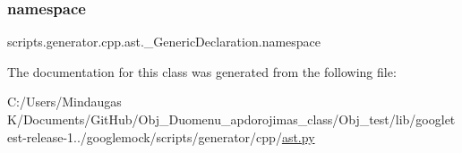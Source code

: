 \mbox{\label{classscripts_1_1generator_1_1cpp_1_1ast_1_1___generic_declaration_a6e7fb8f951551af19f2366876a150817}} 
\subsubsection{\texorpdfstring{namespace}{namespace}}
{\footnotesize\ttfamily scripts.\+generator.\+cpp.\+ast.\+\_\+\+Generic\+Declaration.\+namespace}



The documentation for this class was generated from the following file\+:\begin{DoxyCompactItemize}
\item 
C\+:/\+Users/\+Mindaugas K/\+Documents/\+Git\+Hub/\+Obj\+\_\+\+Duomenu\+\_\+apdorojimas\+\_\+class/\+Obj\+\_\+test/lib/googletest-\/release-\/1../googlemock/scripts/generator/cpp/\mbox{\hyperlink{_obj__test_2lib_2googletest-release-1_88_81_2googlemock_2scripts_2generator_2cpp_2ast_8py}{ast.\+py}}\end{DoxyCompactItemize}
